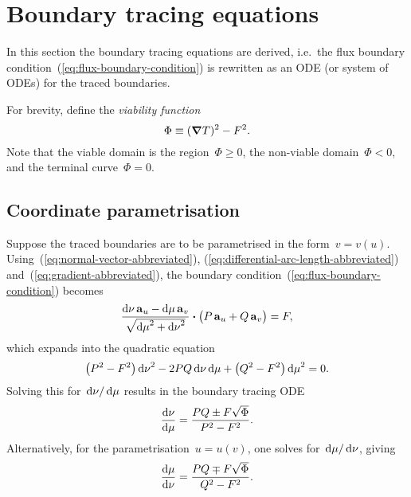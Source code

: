 \section{Boundary tracing equations}
\label{sec:curvilinear.tracing}

In this section the boundary tracing equations are derived,
i.e.~the flux boundary condition~(\ref{eq:flux-boundary-condition})
is rewritten as an ODE (or system of ODEs) for the traced boundaries.

For brevity, define the \emph{viability function}
\begin{equation}
  \Phi \equiv (\mathop{}\!\boldsymbol{\mathrm{\nabla}} T)^2 - F^2.
  \label{eq:viability-function}
\end{equation}
Note that
the viable domain is the region~$\Phi \ge 0$,
the non-viable domain~$\Phi < 0$,
and the terminal curve~$\Phi = 0$.

\subsection{Coordinate parametrisation}
\label{sec:curvilinear.tracing.coordinate}

Suppose the traced boundaries are to be parametrised
in the form~$v = v (u)$.
Using~(\ref{eq:normal-vector-abbreviated}),
(\ref{eq:differential-arc-length-abbreviated})
and~(\ref{eq:gradient-abbreviated}),
the boundary condition~(\ref{eq:flux-boundary-condition}) becomes
\[
  \frac{
    \td \nu \basisvec{u} - \td \mu \basisvec{v}
  }{
    \sqrt{{\td \mu}^2 + {\td \nu}^2}
  }
    \dotp
  \roundbr[\big]{P \basisvec{u} + Q \basisvec{v}}
    =
  F,
\]
which expands into the quadratic equation
\begin{equation}
  \roundbr*{P^2 - F^2} \, {\td \nu}^2
  - 2 P Q \td \nu \td \mu
  + \roundbr*{Q^2 - F^2} \, {\td \mu}^2
    =
  0.
  \label{eq:tracing-coordinate-parametrisation-quadratic}
\end{equation}
Solving this for~$\mathop{}\!\mathrm{d} \nu / \mathop{}\!\mathrm{d} \mu$ results in the boundary tracing ODE
\begin{equation}
  \frac{\mathop{}\!\mathrm{d} \nu}{\mathop{}\!\mathrm{d} \mu} = \frac{P Q \pm F \sqrt{\Phi}}{P^2 - F^2}.
  \label{eq:tracing-ode-coordinate-parametrisation}
\end{equation}
Alternatively, for the parametrisation~$u = u (v)$,
one solves for~$\mathop{}\!\mathrm{d} \mu / \mathop{}\!\mathrm{d} \nu$, giving
\begin{equation}
  \frac{\mathop{}\!\mathrm{d} \mu}{\mathop{}\!\mathrm{d} \nu} = \frac{P Q \mp F \sqrt{\Phi}}{Q^2 - F^2}.
  \label{eq:tracing-ode-coordinate-parametrisation-inverted}
\end{equation}

